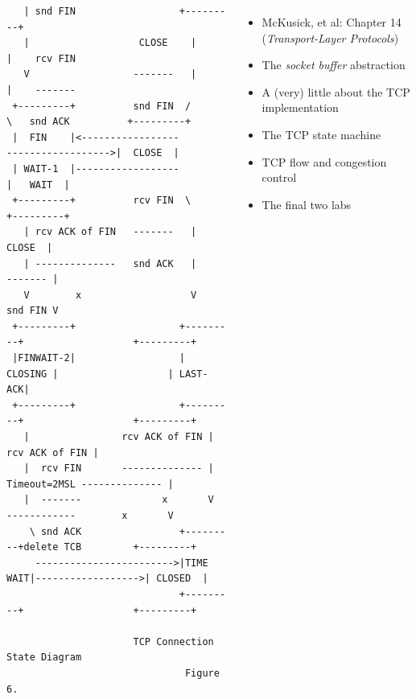 \begin{frame}[fragile]
\begin{columns}[T]
\begin{Tiny}
\begin{verbatim}
   | snd FIN                  +---------+                              
   |                   CLOSE    |     |    rcv FIN                     
   V                  -------   |     |    -------                     
 +---------+          snd FIN  /       \   snd ACK          +---------+
 |  FIN    |<-----------------           ------------------>|  CLOSE  |
 | WAIT-1  |------------------                              |   WAIT  |
 +---------+          rcv FIN  \                            +---------+
   | rcv ACK of FIN   -------   |                            CLOSE  |  
   | --------------   snd ACK   |                           ------- |  
   V        x                   V                           snd FIN V  
 +---------+                  +---------+                   +---------+
 |FINWAIT-2|                  | CLOSING |                   | LAST-ACK|
 +---------+                  +---------+                   +---------+
   |                rcv ACK of FIN |                 rcv ACK of FIN |  
   |  rcv FIN       -------------- |    Timeout=2MSL -------------- |  
   |  -------              x       V    ------------        x       V  
    \ snd ACK                 +---------+delete TCB         +---------+
     ------------------------>|TIME WAIT|------------------>| CLOSED  |
                              +---------+                   +---------+

                      TCP Connection State Diagram
                               Figure 6.
\end{verbatim}
  \end{Tiny}

    \bigskip
    \begin{itemize}
      \item McKusick, et al: Chapter 14 (\textit{Transport-Layer Protocols})
      \item The \textit{socket buffer} abstraction
      \item A (very) little about the TCP implementation
      \item The TCP state machine
      \item TCP flow and congestion control
      \item The final two labs
    \end{itemize}
  \end{columns}

\end{frame}


